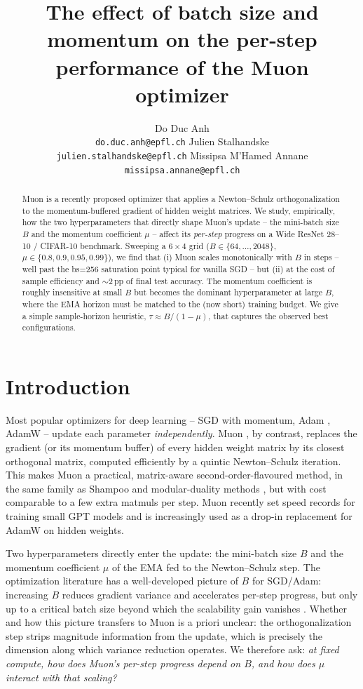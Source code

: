 \documentclass{article}
\title{The effect of batch size and momentum on the per-step performance of the Muon optimizer}
\author{
Do Duc Anh \\
\texttt{do.duc.anh@epfl.ch}
\AND
Julien Stalhandske \\
\texttt{julien.stalhandske@epfl.ch}
\AND
Missipsa M'Hamed Annane \\
\texttt{missipsa.annane@epfl.ch}
}
\begin{document}
\maketitle

\begin{abstract}
Muon \citep{jordan2024muon} is a recently proposed optimizer that applies a Newton--Schulz orthogonalization to the momentum-buffered gradient of hidden weight matrices. We study, empirically, how the two hyperparameters that directly shape Muon's update -- the mini-batch size $B$ and the momentum coefficient $\mu$ -- affect its \emph{per-step} progress on a Wide ResNet 28--10 / CIFAR-10 benchmark. Sweeping a $6\times4$ grid ($B\in\{64,\dots,2048\}$, $\mu\in\{0.8,0.9,0.95,0.99\}$), we find that (i) Muon scales monotonically with $B$ in steps -- well past the bs=256 saturation point typical for vanilla SGD -- but (ii) at the cost of sample efficiency and $\sim$2\,pp of final test accuracy. The momentum coefficient is roughly insensitive at small $B$ but becomes the dominant hyperparameter at large $B$, where the EMA horizon must be matched to the (now short) training budget. We give a simple sample-horizon heuristic, $\tau \approx B/(1-\mu)$, that captures the observed best configurations.
\end{abstract}

\section{Introduction}
\label{sec:intro}

Most popular optimizers for deep learning -- SGD with momentum, Adam \citep{kingma2015adam}, AdamW \citep{loshchilov2019decoupled} -- update each parameter \emph{independently}. Muon \citep{jordan2024muon}, by contrast, replaces the gradient (or its momentum buffer) of every hidden weight matrix by its closest orthogonal matrix, computed efficiently by a quintic Newton--Schulz iteration. This makes Muon a practical, matrix-aware second-order-flavoured method, in the same family as Shampoo \citep{gupta2024shampoo} and modular-duality methods \citep{bernstein2024modular}, but with cost comparable to a few extra matmuls per step. Muon recently set speed records for training small GPT models and is increasingly used as a drop-in replacement for AdamW on hidden weights.

Two hyperparameters directly enter the update: the mini-batch size $B$ and the momentum coefficient $\mu$ of the EMA fed to the Newton--Schulz step. The optimization literature has a well-developed picture of $B$ for SGD/Adam: increasing $B$ reduces gradient variance and accelerates per-step progress, but only up to a critical batch size beyond which the scalability gain vanishes \citep{mccandlish2018empirical, shallue2019measuring}. Whether and how this picture transfers to Muon is a priori unclear: the orthogonalization step strips magnitude information from the update, which is precisely the dimension along which variance reduction operates. We therefore ask: \emph{at fixed compute, how does Muon's per-step progress depend on $B$, and how does $\mu$ interact with that scaling?}
\end{document}
